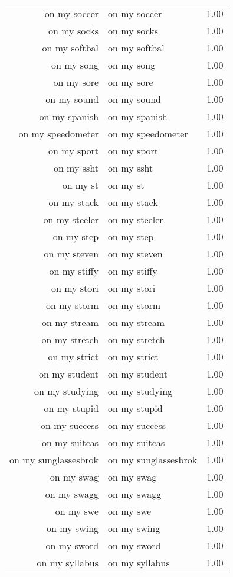 \begin{table}[ht]
\begin{tabular}{rlr}
  on my soccer & on my soccer & 1.00 \\ 
  on my socks & on my socks & 1.00 \\ 
  on my softbal & on my softbal & 1.00 \\ 
  on my song & on my song & 1.00 \\ 
  on my sore & on my sore & 1.00 \\ 
  on my sound & on my sound & 1.00 \\ 
  on my spanish & on my spanish & 1.00 \\ 
  on my speedometer & on my speedometer & 1.00 \\ 
  on my sport & on my sport & 1.00 \\ 
  on my ssht & on my ssht & 1.00 \\ 
  on my st & on my st & 1.00 \\ 
  on my stack & on my stack & 1.00 \\ 
  on my steeler & on my steeler & 1.00 \\ 
  on my step & on my step & 1.00 \\ 
  on my steven & on my steven & 1.00 \\ 
  on my stiffy & on my stiffy & 1.00 \\ 
  on my stori & on my stori & 1.00 \\ 
  on my storm & on my storm & 1.00 \\ 
  on my stream & on my stream & 1.00 \\ 
  on my stretch & on my stretch & 1.00 \\ 
  on my strict & on my strict & 1.00 \\ 
  on my student & on my student & 1.00 \\ 
  on my studying & on my studying & 1.00 \\ 
  on my stupid & on my stupid & 1.00 \\ 
  on my success & on my success & 1.00 \\ 
  on my suitcas & on my suitcas & 1.00 \\ 
  on my sunglassesbrok & on my sunglassesbrok & 1.00 \\ 
  on my swag & on my swag & 1.00 \\ 
  on my swagg & on my swagg & 1.00 \\ 
  on my swe & on my swe & 1.00 \\ 
  on my swing & on my swing & 1.00 \\ 
  on my sword & on my sword & 1.00 \\ 
  on my syllabus & on my syllabus & 1.00 \\ 

\end{tabular}
\end{table}
